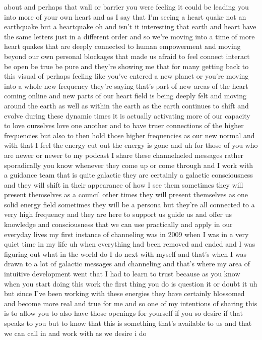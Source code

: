 \documentclass{article}
\begin{document}
about and perhaps that wall or barrier you were feeling it could be
leading you into more of your own heart and as I say that I'm seeing a
heart quake not an earthquake but a heartquake oh and isn't it
interesting that earth and heart have the same letters just in a
different order and so we're moving into a time of more heart quakes
that are deeply connected to human empowerment and moving beyond our own
personal blockages that made us afraid to feel connect interact be open
be true be pure and they're showing me that for many getting back to
this visual of perhaps feeling like you've entered a new planet or
you're moving into a whole new frequency they're saying that's part of
new areas of the heart coming online and new parts of our heart field is
being deeply felt and moving around the earth as well as within the
earth as the earth continues to shift and evolve during these dynamic
times it is actually activating more of our capacity to love ourselves
love one another and to have truer connections of the higher frequencies
but also to then hold those higher frequencies as our new normal and
with that I feel the energy cut out the energy is gone and uh for those
of you who are newer or newer to my podcast I share these channelneled
messages rather sporadically you know whenever they come up or come
through and I work with a guidance team that is quite galactic they are
certainly a galactic consciousness and they will shift in their
appearance of how I see them sometimes they will present themselves as a
council other times they will present themselves as one solid energy
field sometimes they will be a persona but they're all connected to a
very high frequency and they are here to support us guide us and offer
us knowledge and consciousness that we can use practically and apply in
our everyday lives my first instance of channeling was in 2009 when I
was in a very quiet time in my life uh when everything had been removed
and ended and I was figuring out what in the world do I do next with
myself and that's when I was drawn to a lot of galactic messages and
channeling and that's where my area of intuitive development went that I
had to learn to trust because as you know when you start doing this work
the first thing you do is question it or doubt it uh but since I've been
working with these energies they have certainly blossomed and become
more real and true for me and so one of my intentions of sharing this is
to allow you to also have those openings for yourself if you so desire
if that speaks to you but to know that this is something that's
available to us and that we can call in and work with as we desire i do
\end{document}
